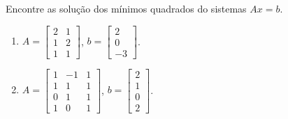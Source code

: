 \begin{question}
  Encontre as solução dos mínimos quadrados do sistemas $Ax = b$.
  \begin{multicols}{2}
    \begin{enumerate}[label=\alph*)]
      \item $A = \begin{bmatrix}
                2 & 1 \\ 1 & 2 \\ 1 & 1
              \end{bmatrix}$, $b = \begin{bmatrix}
                2 \\ 0 \\ -3
              \end{bmatrix}$.
      \item $A = \begin{bmatrix}
                1 & -1 & 1 \\ 1 & 1 & 1 \\ 0 & 1 & 1 \\ 1 & 0 & 1
              \end{bmatrix}$, $b = \begin{bmatrix}
                2 \\ 1 \\ 0 \\ 2
              \end{bmatrix}$.
    \end{enumerate}
  \end{multicols}
\end{question}

